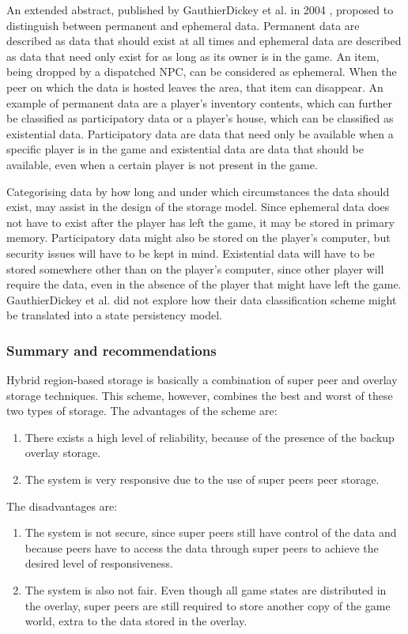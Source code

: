\documentclass[10pt,a4paper,journal,cspaper,compsoc]{IEEEtran}
\begin{document}
An extended abstract, published by GauthierDickey et al. in 2004 \cite{hybrid_storage1}, proposed to distinguish between permanent and ephemeral
data. Permanent data are described as data that should exist at all times and ephemeral data are described as data that need only exist for as long
as its owner is in the game. An item, being dropped by a dispatched NPC, can be considered as ephemeral. When the peer on which the data is hosted
leaves the area, that item can disappear. An example of permanent data are a player's inventory contents, which can further be classified as
participatory data or a player's house, which can be classified as existential data. Participatory data are data that need only be available when a
specific player is in the game and existential data are data that should be available, even when a certain player is not present in the game.

Categorising data by how long and under which circumstances the data should exist, may assist in the design of the storage model. Since ephemeral
data does not have to exist after the player has left the game, it may be stored in primary memory. Participatory data might also be stored on the
player's computer, but security issues will have to be kept in mind. Existential data will have to be stored somewhere other than on the player's
computer, since other player will require the data, even in the absence of the player that might have left the game. GauthierDickey et al. did not
explore how their data classification scheme might be translated into a state persistency model.

\subsubsection{Summary and recommendations}

Hybrid region-based storage is basically a combination of super peer and overlay storage techniques. This scheme, however, combines the best and
worst of these two types of storage. The advantages of the scheme are:
%
\begin{enumerate}
    \item There exists a high level of reliability, because of the presence of the backup overlay storage.
    \item The system is very responsive due to the use of super peers peer storage.
\end{enumerate}

The disadvantages are:
%
\begin{enumerate}
    \item The system is not secure, since super peers still have control of the data and because peers have to access the data through super
        peers to achieve the desired level of responsiveness.
    \item The system is also not fair. Even though all game states are distributed in the overlay, super peers are still required to store
        another copy of the game world, extra to the data stored in the overlay.
\end{enumerate}
\end{document}
